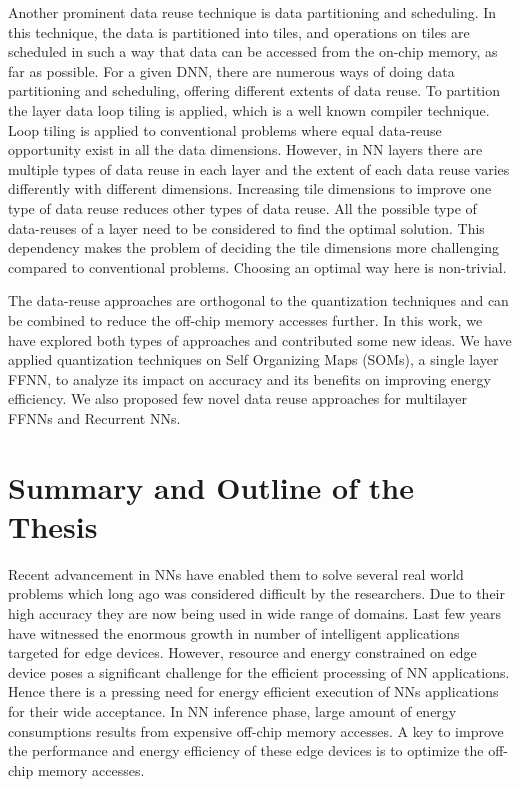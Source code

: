 Another prominent data reuse technique is data partitioning and scheduling. In this technique, the data is partitioned into tiles, and operations on tiles are scheduled in such a way that data can be accessed from the on-chip memory, as far as possible. For a given DNN, there are numerous ways of doing data partitioning and scheduling, offering different extents of data reuse. To partition the layer data loop tiling is applied, which is a well known compiler technique. Loop tiling is applied to conventional problems where equal data-reuse opportunity exist in all the data dimensions. However, in NN layers there are multiple types of data reuse in each layer and the extent of each data reuse varies differently with different dimensions. Increasing  tile dimensions to improve one type of data reuse reduces other types of data reuse. All the possible type of data-reuses of a layer need to be considered to find the optimal solution. This dependency makes the problem of deciding the tile dimensions more challenging compared to conventional problems. Choosing an optimal way here is non-trivial.

The data-reuse approaches are orthogonal to the quantization techniques and can be combined to reduce the off-chip memory accesses further. In this work, we have explored both types of approaches and contributed some new ideas. We have applied quantization techniques on Self Organizing Maps (SOMs), a single layer FFNN, to analyze its impact on accuracy and its benefits on improving energy efficiency. We also proposed few novel data reuse approaches for multilayer FFNNs and Recurrent NNs. 

\section{Summary and Outline of the Thesis} 
Recent advancement in NNs have enabled them to solve several real world problems which long ago was considered difficult by the researchers. Due to their high accuracy they are now being used in wide range of domains. Last few years have witnessed the enormous growth in number of intelligent applications targeted for edge devices. However, resource and energy constrained on edge device poses a significant challenge for the efficient processing of NN applications. Hence there is a pressing need for energy efficient execution of NNs applications for their wide acceptance. In NN inference phase, large amount of energy consumptions results from expensive off-chip memory accesses. A key to improve the performance and energy efficiency of these edge devices is to optimize the off-chip memory accesses.
 
